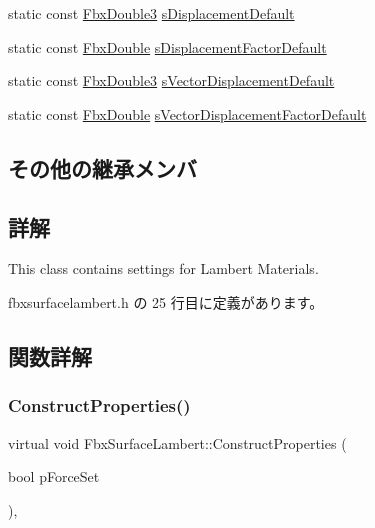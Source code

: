 \begin{DoxyCompactItemize}
\item 
static const \hyperlink{fbxtypes_8h_ae0a96f14cde566774c7553aa7523b7a7}{Fbx\+Double3} \hyperlink{class_fbx_surface_lambert_aa196761f2af76faff4513ca720918413}{s\+Displacement\+Default}
\item 
static const \hyperlink{fbxtypes_8h_a171e72a1c46fc15c1a6c9c31948c1c5b}{Fbx\+Double} \hyperlink{class_fbx_surface_lambert_aeb59fa42db9bb880fa1b57a1df8d68b2}{s\+Displacement\+Factor\+Default}
\item 
static const \hyperlink{fbxtypes_8h_ae0a96f14cde566774c7553aa7523b7a7}{Fbx\+Double3} \hyperlink{class_fbx_surface_lambert_a1cf42552e56bb7356da1e4d1a2c96603}{s\+Vector\+Displacement\+Default}
\item 
static const \hyperlink{fbxtypes_8h_a171e72a1c46fc15c1a6c9c31948c1c5b}{Fbx\+Double} \hyperlink{class_fbx_surface_lambert_a76cd8871ef0d347837dde4caf23e6f71}{s\+Vector\+Displacement\+Factor\+Default}
\end{DoxyCompactItemize}
\subsection*{その他の継承メンバ}


\subsection{詳解}
This class contains settings for Lambert Materials. 

 fbxsurfacelambert.\+h の 25 行目に定義があります。



\subsection{関数詳解}
\mbox{\label{class_fbx_surface_lambert_a6693e1c08050978c78eece2aa48688e9}} 
\subsubsection{\texorpdfstring{Construct\+Properties()}{ConstructProperties()}}
{\footnotesize\ttfamily virtual void Fbx\+Surface\+Lambert\+::\+Construct\+Properties (\begin{DoxyParamCaption}\item[{bool}]{p\+Force\+Set }\end{DoxyParamCaption})\hspace{0.3cm}{\ttfamily [protected]}, {\ttfamily [virtual]}}

